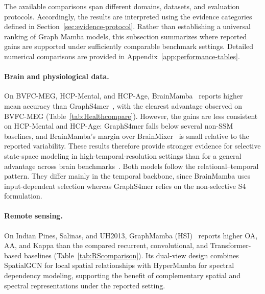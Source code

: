 \documentclass[acmsmall]{acmart}
\begin{document}
The available comparisons span different domains, datasets, and evaluation
protocols. Accordingly, the results are interpreted using the evidence
categories defined in Section~\ref{sec:evidence-protocol}. Rather than
establishing a universal ranking of Graph Mamba models, this subsection
summarizes where reported gains are supported under sufficiently comparable
benchmark settings. Detailed numerical comparisons are provided in
Appendix~\ref{app:performance-tables}.

\paragraph{\textbf{Brain and physiological data.}}
On BVFC-MEG, HCP-Mental, and HCP-Age, BrainMamba~\cite{behrouz2024brain}
reports higher mean accuracy than GraphS4mer~\cite{tang2023modeling}, with the
clearest advantage observed on BVFC-MEG
(Table~\ref{tab:Healthcompare}). However, the gains are less consistent on
HCP-Mental and HCP-Age: GraphS4mer falls below several non-SSM baselines, and
BrainMamba's margin over BrainMixer~\cite{behrouz2023learning} is small relative
to the reported variability. These results therefore provide stronger evidence
for selective state-space modeling in high-temporal-resolution settings than for
a general advantage across brain benchmarks~\cite{behrouz2024brain}. Both models follow the relational–temporal pattern. They differ mainly in the temporal backbone, since BrainMamba uses input-dependent selection whereas GraphS4mer relies on the non-selective S4 formulation.

\paragraph{\textbf{Remote sensing.}}
On Indian Pines, Salinas, and UH2013, GraphMamba (HSI)~\cite{yang2024graphmamba}
reports higher OA, AA, and Kappa than the compared recurrent, convolutional,
and Transformer-based baselines (Table~\ref{tab:RScomparison}). Its dual-view
design combines SpatialGCN for local spatial relationships with HyperMamba for
spectral dependency modeling, supporting the benefit of complementary spatial
and spectral representations under the reported setting.
\end{document}
